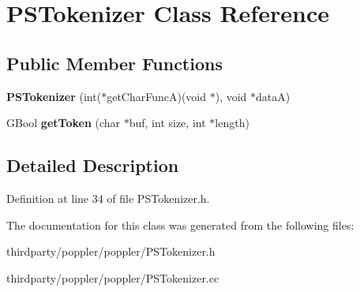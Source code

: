 \hypertarget{class_p_s_tokenizer}{}\section{P\+S\+Tokenizer Class Reference}
\label{class_p_s_tokenizer}
\subsection*{Public Member Functions}
\begin{DoxyCompactItemize}
\item 
\mbox{\label{class_p_s_tokenizer_a2c20d9445b784a71cad5f6e599383efc}} 
{\bfseries P\+S\+Tokenizer} (int($\ast$get\+Char\+FuncA)(void $\ast$), void $\ast$dataA)
\item 
\mbox{\label{class_p_s_tokenizer_aa6e76d651c57991ef112d7bc17a3e4e8}} 
G\+Bool {\bfseries get\+Token} (char $\ast$buf, int size, int $\ast$length)
\end{DoxyCompactItemize}


\subsection{Detailed Description}


Definition at line 34 of file P\+S\+Tokenizer.\+h.



The documentation for this class was generated from the following files\+:\begin{DoxyCompactItemize}
\item 
thirdparty/poppler/poppler/P\+S\+Tokenizer.\+h\item 
thirdparty/poppler/poppler/P\+S\+Tokenizer.\+cc\end{DoxyCompactItemize}
